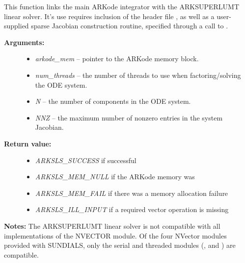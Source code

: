 \documentclass[letterpaper,10pt,english]{sphinxmanual}
\begin{document}
\begin{fulllineitems}
\label{c_interface/User_callable:c.ARKSuperLUMT}
This function links the main ARKode integrator with the ARKSUPERLUMT
linear solver.  It's use requires inclusion of the header file
, as well as a user-supplied sparse Jacobian
construction routine, specified through a call to
{\hyperref[c_interface/User_callable:c.ARKSlsSetSparseJacFn]{\emph{}}}.
\begin{description}
\item[{\textbf{Arguments:}}] \leavevmode\begin{itemize}
\item {} 
\emph{arkode\_mem} -- pointer to the ARKode memory block.

\item {} 
\emph{num\_threads} -- the number of threads to use when
factoring/solving the ODE system.

\item {} 
\emph{N} -- the number of components in the ODE system.

\item {} 
\emph{NNZ} -- the maximum number of nonzero entries in the system
Jacobian.

\end{itemize}

\item[{\textbf{Return value:}}] \leavevmode\begin{itemize}
\item {} 
\emph{ARKSLS\_SUCCESS}   if successful

\item {} 
\emph{ARKSLS\_MEM\_NULL}  if the ARKode memory was 

\item {} 
\emph{ARKSLS\_MEM\_FAIL}  if there was a memory allocation failure

\item {} 
\emph{ARKSLS\_ILL\_INPUT} if a required vector operation is missing

\end{itemize}

\end{description}

\textbf{Notes:}  The ARKSUPERLUMT linear solver is not compatible with
all implementations of the NVECTOR module.  Of the four NVector
modules provided with SUNDIALS, only the serial and threaded
modules ({\hyperref[nvectors/NVector_Serial:nvectors-nvserial]{\emph{}}}, {\hyperref[nvectors/NVector_OpenMP:nvectors-openmp]{\emph{}}} and
{\hyperref[nvectors/NVector_Pthreads:nvectors-pthreads]{\emph{}}}) are compatible.

\end{fulllineitems}
\end{document}
